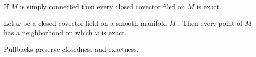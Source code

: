 \setcounter{thm}{48}

\begin{thm}
If $M$ is simply connected then every closed covector filed on $M$ is exact.
\end{thm}

\begin{cor}
Let $\omega$ be a closed covector field on a smooth manifold $M$ \wowob. Then every point of $M$ has a neighborhood on which $\omega$ is exact.
\end{cor}

\nb Pullbacks preserve closedness and exactness.

